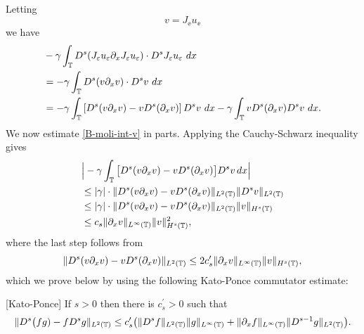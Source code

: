 %
%
%
\noindent
Letting 
%
\begin{equation} 
	\label{v-Je-ue}
	v=J_\ee u_\ee
\end{equation}
%
%
we have
%
\begin{equation} 
	\begin{split}
		\label{B-moli-int-v}
		& -  \gamma \int_{\mathbb{T}}   D^s (J_{\varepsilon} u_{\varepsilon} \partial_x J_\varepsilon u_\varepsilon)
		 \cdot D^s
		J_{\varepsilon}u_\varepsilon \ dx  
		\\
		& = - \gamma \int_{\mathbb{T}}
		 D^s(v \partial_x v) \cdot   D^s v \ dx
		\\
		& = - \gamma \int_{\mathbb{T}}
		\left [ 
		D^s(v\partial_x v)  -  v D^s (\partial_xv)
		\right ] 
		D^s v \ dx - \gamma \int_{\mathbb{T}}
		v D^s (\partial_xv)
		D^s v \ dx.
	\end{split}
\end{equation}
%
%
%
We now estimate \eqref{B-moli-int-v} in parts. Applying the Cauchy-Schwarz inequality gives
%
\begin{equation} 
	\label{int1-est-calc2}
	\begin{split}
		& \Big|
		- \gamma \int_{\mathbb{T}}
		\big[ 
		D^s(v\partial_x v)  -  v D^s (\partial_xv)
		\big]
		D^s v   \, dx
		\Big|
		\\
		& \le
		|\gamma| \cdot \|
		D^s(v\partial_x v)  -  v D^s (\partial_xv)
		\|_{L^2(\mathbb{T})}
		\|
		D^s v 
		\|_{L^2(\mathbb{T})}
		\\
		&\le
		|\gamma| \cdot \|
		D^s(v\partial_x v)  -  v D^s (\partial_xv)
		\|_{L^2(\mathbb{T})}
		\|
		v
		\|_{H^s(\mathbb{T})}
		\\
		&\le c_s \| \partial_x v \|_{L^\infty(\mathbb{T})} 
		\| v \|_{H^s(\mathbb{T})}^2,
	\end{split}
\end{equation}
%
where the last step follows from 
%
\begin{equation} 
	\label{int1-est-calc3}
	\| D^s(v\partial_x v)  -  v D^s (\partial_xv) \|_{L^2(\mathbb{T})}
	\le
	2 c_s^{\prime}    \| \partial_x v \|_{L^\infty(\mathbb{T})} 
	\| v \|_{H^s(\mathbb{T})},
\end{equation}
which we prove below by using the following Kato-Ponce commutator 
estimate:  
\begin{lemma} 
	\label{KP-lemma}
	[Kato-Ponce]
	If  $s>0$ then there is $c_s^{\prime}>0$ such that 
	\begin{equation} 
		\label{KP-com-est}
		\| D^{s} \big(fg) -  f D^s g\|_{L^2(\mathbb{T})}
		\le
		c_s^{\prime}\big(
		\| D^{s}f \|_{L^2(\mathbb{T})}    \| g \|_{L^\infty(\mathbb{T})} 
		+
		\| \partial_xf \|_{L^\infty(\mathbb{T})}    \| D^{s-1}g \|_{L^2(\mathbb{T})}   
		\big).
	\end{equation}
	\end{lemma}
